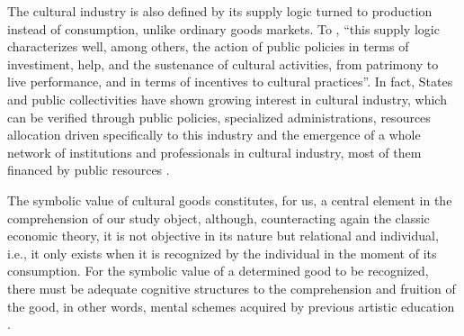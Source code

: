 \documentclass[a4paper, 12pt, openright, oneside, german, french, brazil, english, article]{abntex2}
\begin{document}
	The cultural industry is also defined by its supply logic turned to production instead of consumption, unlike ordinary goods markets. To , ``this supply logic characterizes well, among others, the action of public policies in terms of investiment, help, and the sustenance of cultural activities, from patrimony to live performance, and in terms of incentives to cultural practices''. In fact, States and public collectivities have shown growing interest in cultural industry, which can be verified through public policies, specialized administrations, resources allocation driven specifically to this industry and the emergence of a whole network of institutions and professionals in cultural industry, most of them financed by public resources \cite{tolila2007cultura}.

	

	The symbolic value of cultural goods constitutes, for us, a central element in the comprehension of our study object, although, counteracting again the classic economic theory, it is not objective in its nature but relational and individual, i.e., it only exists when it is recognized by the individual in the moment of its consumption. For the symbolic value of a determined good to be recognized, there must be adequate cognitive structures to the comprehension and fruition of the good, in other words, mental schemes acquired by previous artistic education \cite{bourdieu2003amor}.
	
	
\end{document}
